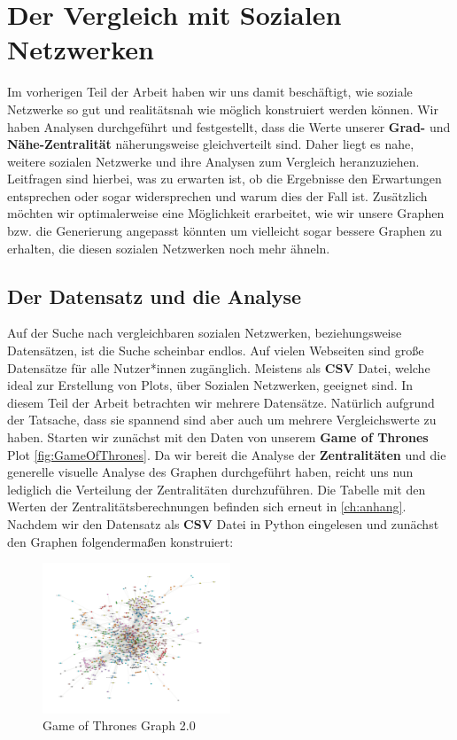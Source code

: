 \chapter{Der Vergleich mit Sozialen Netzwerken}\label{ch:vergleich}

Im vorherigen Teil der Arbeit haben wir uns damit beschäftigt, wie soziale Netzwerke so gut und realitätsnah wie möglich konstruiert werden können. Wir haben Analysen durchgeführt und festgestellt, dass die Werte unserer \textbf{Grad-} und \textbf{Nähe-Zentralität} näherungsweise gleichverteilt sind. Daher liegt es nahe, weitere sozialen Netzwerke und ihre Analysen zum Vergleich heranzuziehen. Leitfragen sind hierbei, was zu erwarten ist, ob die Ergebnisse den Erwartungen entsprechen oder sogar widersprechen und warum dies der Fall ist. Zusätzlich möchten wir optimalerweise eine Möglichkeit erarbeitet, wie wir unsere Graphen bzw. die Generierung angepasst könnten um vielleicht sogar bessere Graphen zu erhalten, die diesen sozialen Netzwerken noch mehr ähneln. 

\section{Der Datensatz und die Analyse}
Auf der Suche nach vergleichbaren sozialen Netzwerken, beziehungsweise Datensätzen, ist die Suche scheinbar endlos. Auf vielen Webseiten sind große Datensätze für alle Nutzer*innen zugänglich. Meistens als \textbf{CSV} Datei, welche ideal zur Erstellung von Plots, über Sozialen Netzwerken, geeignet sind. In diesem Teil der Arbeit betrachten wir mehrere Datensätze. Natürlich aufgrund der Tatsache, dass sie spannend sind aber auch um mehrere Vergleichswerte zu haben. Starten wir zunächst mit den Daten von unserem \textbf{Game of Thrones} Plot \ref{fig:GameOfThrones}. Da wir bereit die Analyse der \textbf{Zentralitäten} und die generelle visuelle Analyse des Graphen durchgeführt haben, reicht uns nun lediglich die Verteilung der Zentralitäten durchzuführen. Die Tabelle mit den Werten der Zentralitätsberechnungen befinden sich erneut in \ref{ch:anhang}. Nachdem wir den Datensatz als \textbf{CSV} Datei in Python eingelesen und zunächst den Graphen folgendermaßen konstruiert:

\FloatBarrier
\begin{figure}[h!]%
  \centering
  \includegraphics[width=0.5\textwidth]{Graphics/GOTGraph_unweighted.png}
  \caption{Game of Thrones Graph 2.0}
  \label{fig:GOT2.0}
\end{figure}
\FloatBarrier

